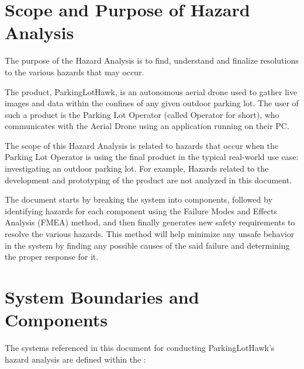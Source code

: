 \documentclass{article}
\begin{document}
\section{Scope and Purpose of Hazard Analysis}

The purpose of the Hazard Analysis is to find, understand and finalize resolutions to the various hazards that may occur.  

The product, ParkingLotHawk, is an autonomous aerial drone used to gather live images and data within the confines of any given outdoor parking lot.  The user of such a product is the Parking Lot Operator (called Operator for short), who communicates with the Aerial Drone using an application running on their PC.

The scope of this Hazard Analysis is related to hazards that occur when the Parking Lot Operator is using the final product in the typical real-world use case: investigating an outdoor parking lot. For example, Hazards related to the development and prototyping of the product are not analyzed in this document. 

The document starts by breaking the system into components, followed by identifying hazards for each component using the Failure Modes and Effects Analysis (FMEA) method, and then finally generates new safety requirements to resolve the various hazards. This method will help minimize any unsafe behavior in the system by finding any possible causes of the said failure and determining the proper response for it.

\section{System Boundaries and Components}
\label{SystemBoundaries}
The systems referenced in this document for conducting ParkingLotHawk’s hazard analysis are defined within the :
\end{document}
